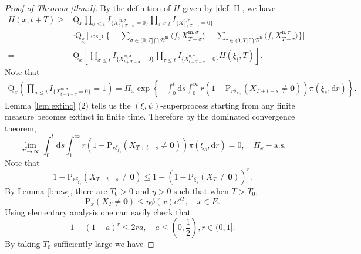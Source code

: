 \documentclass[12pt,a4paper]{amsart}
\numberwithin{equation}{section}
\theoremstyle{plain}
\theoremstyle{definition}
\theoremstyle{remark}
\begin{document}
\begin{proof}[Proof of Theorem \ref{thm:I}]
By the definition of $H$ given by \eqref{def: H},  we have
\begin{equation}\label{subsub}
\begin{aligned}
     H(x,t+T)\geq& \mathrm Q_{x}\prod_{\sigma\leq t}I_{\{ X_{t+T-\sigma}^{{\mathrm m},\sigma}=0\}}\prod_{\tau\leq t}I_{\{ X_{t+T-\tau}^{{\mathrm n},\tau}=0\}}\\
&\cdot\mathrm Q_{\xi_t}\Big[\exp\Big\{-\sum_{\sigma\in (0, T]\bigcap \mathcal D^{\mathrm m}}\langle f, X_{T-\sigma}^{{\mathrm m},\sigma}\rangle -\sum_{\tau\in (0, T]\bigcap \mathcal D^{\mathrm n}}\langle f, X_{T-\tau}^{{\mathrm n},\tau}\rangle \Big\}\Big]\\
=& \mathrm Q_{x}\left[\prod_{\sigma\leq t}I_{\{ X_{t+T-\sigma}^{{\mathrm m},\sigma}=0\}}\prod_{\tau\leq t}I_{\{ X_{t+T-\tau}^{{\mathrm n},\tau}=0\}}H(\xi_t, T)\right].
\end{aligned}
\end{equation}
Note that
\begin{eqnarray*}
\mathrm Q_{x}\left(\prod_{\sigma\leq t}I_{\{ X_{t+T-\sigma}^{{\mathrm m},\sigma}=0\}}=1\right)
=\widetilde\Pi_x\exp\left\{-\int_0^t\mathrm ds\int_0^\infty r(1-\mathrm P_{r\delta_{xi_s}}(X_{T+t-s}\neq\mathbf 0))\pi(\xi_s,\mathrm dr)\right\}.
\end{eqnarray*}
Lemma \ref{lem:extinc} (2) tells us the $(\xi,\psi)$-superprocess starting from any finite measure becomes extinct in finite time.  Therefore
 by the dominated convergence theorem,
\begin{equation}\label{1infty limit}
\lim_{T\rightarrow\infty}\int_0^t\mathrm ds\int_1^\infty r(1-\mathrm P_{r\delta_{\xi_s}}(X_{T+t-s}\neq\mathbf 0))\pi(\xi_s,\mathrm dr)=0,\quad \widetilde\Pi_x-\mbox{a.s.}
\end{equation}
  Note that
\[
1-\mathrm P_{r\delta_{\xi_s}}(X_{T+t-s}\neq\mathbf 0)\leq 1-(1-\mathrm P_{\xi_s}(X_T\neq\mathbf 0))^r.
\]
By Lemma \ref{l:new},
there are $T_0>0$ and $\eta>0$ such that when $T>T_0$, 
\[
\mathrm P_x(X_T\neq \mathbf 0)\leq \eta \phi(x)e^{\lambda T}, \quad x\in E.
\]
Using elementary analysis one can easily check that 
$$
1-(1-a)^r\le 2 ra, \quad a\le (0, \frac12), r\in (0, 1].
$$
By taking $T_0$  sufficiently large we have 

\end{proof}
\end{document}
